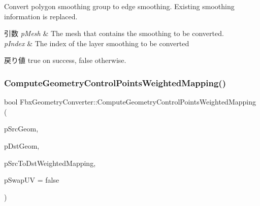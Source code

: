 Convert polygon smoothing group to edge smoothing. Existing smoothing information is replaced.


\begin{DoxyParams}{引数}
{\em p\+Mesh} & The mesh that contains the smoothing to be converted. \\
\hline
{\em p\+Index} & The index of the layer smoothing to be converted \\
\hline
\end{DoxyParams}
\begin{DoxyReturn}{戻り値}
{\ttfamily true} on success, {\ttfamily false} otherwise. 
\end{DoxyReturn}
\mbox{\label{class_fbx_geometry_converter_a3ee0a5af2ed44232dfda82fecd00a875}} 
\subsubsection{\texorpdfstring{Compute\+Geometry\+Control\+Points\+Weighted\+Mapping()}{ComputeGeometryControlPointsWeightedMapping()}}
{\footnotesize\ttfamily bool Fbx\+Geometry\+Converter\+::\+Compute\+Geometry\+Control\+Points\+Weighted\+Mapping (\begin{DoxyParamCaption}\item[{\hyperlink{class_fbx_geometry}{Fbx\+Geometry} $\ast$}]{p\+Src\+Geom,  }\item[{\hyperlink{class_fbx_geometry}{Fbx\+Geometry} $\ast$}]{p\+Dst\+Geom,  }\item[{\hyperlink{class_fbx_weighted_mapping}{Fbx\+Weighted\+Mapping} $\ast$}]{p\+Src\+To\+Dst\+Weighted\+Mapping,  }\item[{bool}]{p\+Swap\+UV = {\ttfamily false} }\end{DoxyParamCaption})}

